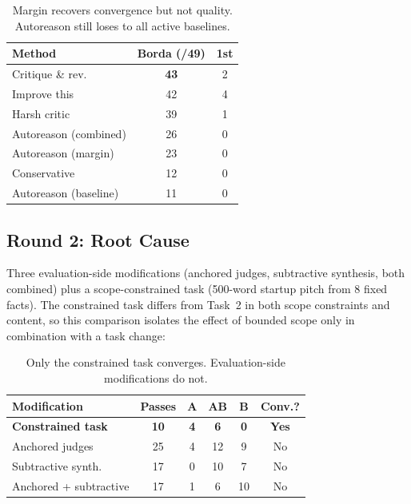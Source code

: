 \documentclass[10pt,twocolumn]{article}
\begin{document}
\begin{table}[H]
\centering
\small
\begin{tabular}{@{}lcc@{}}
\toprule
\textbf{Method} & \textbf{Borda (/49)} & \textbf{1st} \\
\midrule
\rowcolor{TableShade}
Critique \& rev. & \textbf{43} & 2 \\
Improve this & 42 & 4 \\
\rowcolor{TableShade}
Harsh critic & 39 & 1 \\
Autoreason (combined) & 26 & 0 \\
\rowcolor{TableShade}
Autoreason (margin) & 23 & 0 \\
Conservative & 12 & 0 \\
\rowcolor{TableShade}
Autoreason (baseline) & 11 & 0 \\
\bottomrule
\end{tabular}
\caption{Margin recovers convergence but not quality. Autoreason still loses to all active baselines.}
\label{tab:remedy_quality}
\end{table}

\subsection{Round 2: Root Cause}

Three evaluation-side modifications (anchored judges, subtractive synthesis, both combined) plus a scope-constrained task (500-word startup pitch from 8 fixed facts). The constrained task differs from Task~2 in both scope constraints and content, so this comparison isolates the effect of bounded scope only in combination with a task change:

\begin{table}[H]
\centering
\small
\begin{tabular}{@{}lccccc@{}}
\toprule
\textbf{Modification} & \textbf{Passes} & \textbf{A} & \textbf{AB} & \textbf{B} & \textbf{Conv.?} \\
\midrule
\rowcolor{TableShade}
\textbf{Constrained task} & \textbf{10} & \textbf{4} & \textbf{6} & \textbf{0} & \textbf{Yes} \\
Anchored judges & 25 & 4 & 12 & 9 & No \\
\rowcolor{TableShade}
Subtractive synth. & 17 & 0 & 10 & 7 & No \\
Anchored + subtractive & 17 & 1 & 6 & 10 & No \\
\bottomrule
\end{tabular}
\caption{Only the constrained task converges. Evaluation-side modifications do not.}
\label{tab:v3_remedies}
\end{table}
\end{document}
